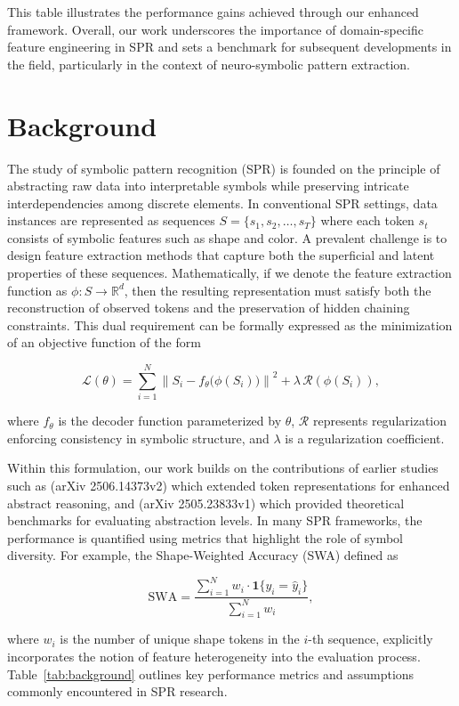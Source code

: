 \documentclass{article}
\begin{document}
This table illustrates the performance gains achieved through our enhanced framework. Overall, our work underscores the importance of domain-specific feature engineering in SPR and sets a benchmark for subsequent developments in the field, particularly in the context of neuro-symbolic pattern extraction.

\section{Background}
The study of symbolic pattern recognition (SPR) is founded on the principle of abstracting raw data into interpretable symbols while preserving intricate interdependencies among discrete elements. In conventional SPR settings, data instances are represented as sequences \( S = \{s_1, s_2, \dots, s_T\} \) where each token \( s_t \) consists of symbolic features such as shape and color. A prevalent challenge is to design feature extraction methods that capture both the superficial and latent properties of these sequences. Mathematically, if we denote the feature extraction function as \( \phi: S \rightarrow \mathbb{R}^d \), then the resulting representation must satisfy both the reconstruction of observed tokens and the preservation of hidden chaining constraints. This dual requirement can be formally expressed as the minimization of an objective function of the form

\[
\mathcal{L}(\theta) = \sum_{i=1}^N \left\| S_i - f_\theta\bigl(\phi(S_i)\bigr) \right\|^2 + \lambda \, \mathcal{R}(\phi(S_i)),
\]

where \( f_\theta \) is the decoder function parameterized by \( \theta \), \( \mathcal{R} \) represents regularization enforcing consistency in symbolic structure, and \( \lambda \) is a regularization coefficient.

Within this formulation, our work builds on the contributions of earlier studies such as (arXiv 2506.14373v2) which extended token representations for enhanced abstract reasoning, and (arXiv 2505.23833v1) which provided theoretical benchmarks for evaluating abstraction levels. In many SPR frameworks, the performance is quantified using metrics that highlight the role of symbol diversity. For example, the Shape-Weighted Accuracy (SWA) defined as

\[
\text{SWA} = \frac{\sum_{i=1}^{N} w_i \cdot \mathbf{1}\{y_i = \hat{y}_i\}}{\sum_{i=1}^{N} w_i},
\]

where \( w_i \) is the number of unique shape tokens in the \( i \)-th sequence, explicitly incorporates the notion of feature heterogeneity into the evaluation process. Table~\ref{tab:background} outlines key performance metrics and assumptions commonly encountered in SPR research.
\end{document}
